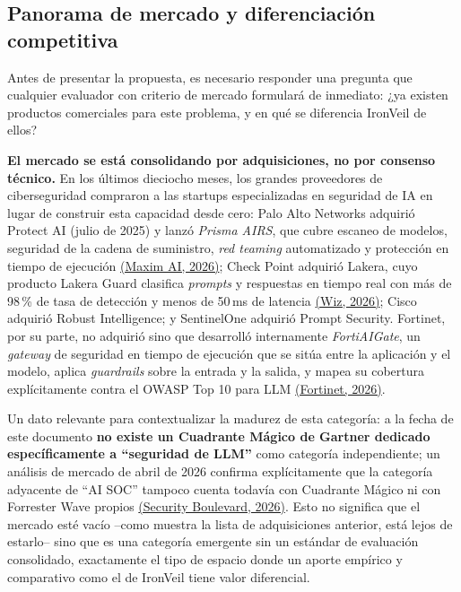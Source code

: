 \documentclass[11pt,letterpaper]{article}
\newcommand{\citeapa}[2]{\hyperlink{#1}{#2}}
\begin{document}
\subsection{Panorama de mercado y diferenciación competitiva}
\label{sec:mercado}

Antes de presentar la propuesta, es necesario responder una pregunta que cualquier evaluador con criterio de mercado formulará de inmediato: ¿ya existen productos comerciales para este problema, y en qué se diferencia IronVeil de ellos?

\textbf{El mercado se está consolidando por adquisiciones, no por consenso técnico.} En los últimos dieciocho meses, los grandes proveedores de ciberseguridad compraron a las startups especializadas en seguridad de IA en lugar de construir esta capacidad desde cero: Palo Alto Networks adquirió Protect AI (julio de 2025) y lanzó \emph{Prisma AIRS}, que cubre escaneo de modelos, seguridad de la cadena de suministro, \emph{red teaming} automatizado y protección en tiempo de ejecución \citeapa{getmaxim2026}{(Maxim AI, 2026)}; Check Point adquirió Lakera, cuyo producto Lakera Guard clasifica \emph{prompts} y respuestas en tiempo real con más de 98\,\% de tasa de detección y menos de 50\,ms de latencia \citeapa{wiz2026}{(Wiz, 2026)}; Cisco adquirió Robust Intelligence; y SentinelOne adquirió Prompt Security. Fortinet, por su parte, no adquirió sino que desarrolló internamente \emph{FortiAIGate}, un \emph{gateway} de seguridad en tiempo de ejecución que se sitúa entre la aplicación y el modelo, aplica \emph{guardrails} sobre la entrada y la salida, y mapea su cobertura explícitamente contra el OWASP Top 10 para LLM \citeapa{fortinet2026}{(Fortinet, 2026)}.

Un dato relevante para contextualizar la madurez de esta categoría: a la fecha de este documento \textbf{no existe un Cuadrante Mágico de Gartner dedicado específicamente a ``seguridad de LLM''} como categoría independiente; un análisis de mercado de abril de 2026 confirma explícitamente que la categoría adyacente de ``AI SOC'' tampoco cuenta todavía con Cuadrante Mágico ni con Forrester Wave propios \citeapa{securityboulevard2026}{(Security Boulevard, 2026)}. Esto no significa que el mercado esté vacío --como muestra la lista de adquisiciones anterior, está lejos de estarlo-- sino que es una categoría emergente sin un estándar de evaluación consolidado, exactamente el tipo de espacio donde un aporte empírico y comparativo como el de IronVeil tiene valor diferencial.
\end{document}
